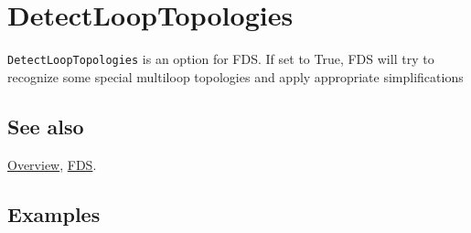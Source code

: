 \documentclass[../FeynCalcManual.tex]{subfiles}
\begin{document}
\hypertarget{detectlooptopologies}{
\section{DetectLoopTopologies}\label{detectlooptopologies}}

\texttt{DetectLoopTopologies} is an option for FDS. If set to True, FDS
will try to recognize some special multiloop topologies and apply
appropriate simplifications

\subsection{See also}

\hyperlink{toc}{Overview}, \hyperlink{fds}{FDS}.

\subsection{Examples}
\end{document}
